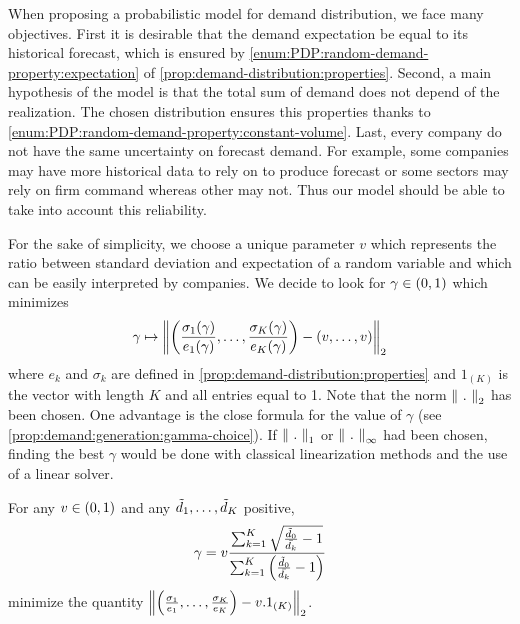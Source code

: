 When proposing a probabilistic model for demand distribution, we face many objectives.
First it is desirable that the demand expectation be equal to its historical forecast, which is ensured by \cref{enum:PDP:random-demand-property:expectation} of \cref{prop:demand-distribution:properties}.
Second, a main hypothesis of the model is that the total sum of demand does not depend of the realization.
The chosen distribution ensures this properties thanks to \cref{enum:PDP:random-demand-property:constant-volume}.
Last, every company do not have the same uncertainty on forecast demand.
For example, some companies may have more historical data to rely on to produce forecast or some sectors may rely on firm command whereas other may not.
Thus our model should be able to take into account this reliability.


For the sake of simplicity, we choose a unique parameter $v$ which represents the ratio between standard deviation and expectation of a random variable and which can be easily interpreted by companies.
We decide to look for $\gamma\in\bracket{0,1}$ which minimizes
\begin{equation}
  \gamma\mapsto\norm{\bracket{\frac{\sigma_1(\gamma)}{e_1(\gamma)},\ldots,\frac{\sigma_K(\gamma)}{e_K(\gamma)}}-\bracket{v,\ldots,v}}_2
\end{equation}
where $e_k$ and $\sigma_k$ are defined in \cref{prop:demand-distribution:properties} and $1_{(K)}$ is the vector with length $K$ and all entries equal to 1.
Note that the norm $\norm{\ .\ }_2$ has been chosen.
One advantage is the close formula for the value of $\gamma$ (see \cref{prop:demand:generation:gamma-choice}).
If $\norm{\ .\ }_1$ or $\norm{\ .\ }_{\infty}$ had been chosen, finding the best $\gamma$ would be done with classical linearization methods and the use of a linear solver.


\begin{prop}\label{prop:demand:generation:gamma-choice}
For any $v\in\bracket{0,1}$ and any $\tilde{d}_1,\ldots,\tilde{d}_K$ positive,
\begin{equation}
  \gamma
  =
  v\frac
  {\sum_{k=1}^K\sqrt{\frac{\tilde{\demand}_0}{\bar{\demand_k}}-1}}
  {\sum_{k=1}^K\bracket{\frac{\tilde{\demand}_0}{\bar{\demand_k}}-1}}
\end{equation}
minimize the quantity
$\norm{\bracket{\frac{\sigma_1}{e_1},\ldots,\frac{\sigma_K}{e_K}}-v.1_{(K)}}_2$.
\end{prop}


